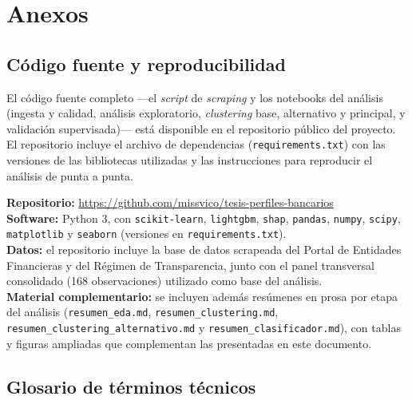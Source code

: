 \documentclass[11pt,a4paper]{article}
\begin{document}
\section{Anexos}
\label{sec:anexos}

\subsection{Código fuente y reproducibilidad}

El código fuente completo ---el \textit{script} de \textit{scraping} y los notebooks del análisis (ingesta y
calidad, análisis exploratorio, \textit{clustering} base, alternativo y principal, y validación supervisada)---
está disponible en el repositorio público del proyecto. El repositorio incluye el archivo de dependencias
(\texttt{requirements.txt}) con las versiones de las bibliotecas utilizadas y las instrucciones para reproducir
el análisis de punta a punta.

\begin{notebox}
\small
\textbf{Repositorio:} \url{https://github.com/missvico/tesis-perfiles-bancarios}\\
\textbf{Software:} Python 3, con \texttt{scikit-learn}, \texttt{lightgbm}, \texttt{shap}, \texttt{pandas},
\texttt{numpy}, \texttt{scipy}, \texttt{matplotlib} y \texttt{seaborn} (versiones en \texttt{requirements.txt}).\\
\textbf{Datos:} el repositorio incluye la base de datos scrapeada del Portal de Entidades Financieras
y del Régimen de Transparencia, junto con el panel transversal consolidado (168 observaciones)
utilizado como base del análisis.\\
\textbf{Material complementario:} se incluyen además resúmenes en prosa por etapa del análisis
(\texttt{resumen\_eda.md}, \texttt{resumen\_clustering.md}, \texttt{resumen\_clustering\_alternativo.md}
y \texttt{resumen\_clasificador.md}), con tablas y figuras ampliadas que complementan las presentadas
en este documento.
\end{notebox}

\subsection{Glosario de términos técnicos}
\end{document}
